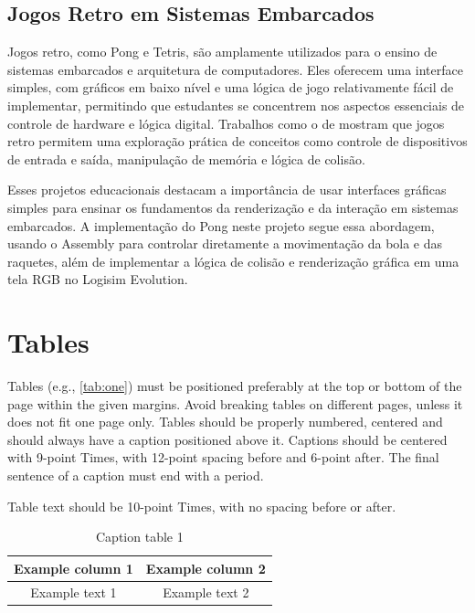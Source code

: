 \documentclass[english, spanish,brazilian]{RBIEarticle} %
\begin{document}
\begin{itemize}
\subsection{Jogos Retro em Sistemas Embarcados}

Jogos retro, como Pong e Tetris, são amplamente utilizados para o ensino de sistemas embarcados e arquitetura de computadores. Eles oferecem uma interface simples, com gráficos em baixo nível e uma lógica de jogo relativamente fácil de implementar, permitindo que estudantes se concentrem nos aspectos essenciais de controle de hardware e lógica digital. Trabalhos como o de \cite{autorJogoRetro} mostram que jogos retro permitem uma exploração prática de conceitos como controle de dispositivos de entrada e saída, manipulação de memória e lógica de colisão.

Esses projetos educacionais destacam a importância de usar interfaces gráficas simples para ensinar os fundamentos da renderização e da interação em sistemas embarcados. A implementação do Pong neste projeto segue essa abordagem, usando o Assembly para controlar diretamente a movimentação da bola e das raquetes, além de implementar a lógica de colisão e renderização gráfica em uma tela RGB no Logisim Evolution.




\section{Tables}
Tables (e.g., \autoref{tab:one}) must be positioned preferably at the top or bottom of the page within the given margins. Avoid breaking tables on different pages, unless it does not fit one page only. Tables should be properly numbered, centered and should always have a caption positioned above it. Captions should be centered with 9-point Times, with 12-point spacing before and 6-point after. The final sentence of a caption must end with a period.

Table text should be 10-point Times, with no spacing before or after.

\begin{table}[h]
	\caption{Caption table 1}
	\label{tab:one}
	\centering\footnotesize%
	\begin{tabular}{|c|c|}
		\hline
		\rowcolor{gray} \textbf{Example column 1} & \textbf{Example column 2}\\
		\hline
		Example text 1 & Example text 2\\
		\hline
	\end{tabular}
\end{table}



\end{itemize}
\end{document}
